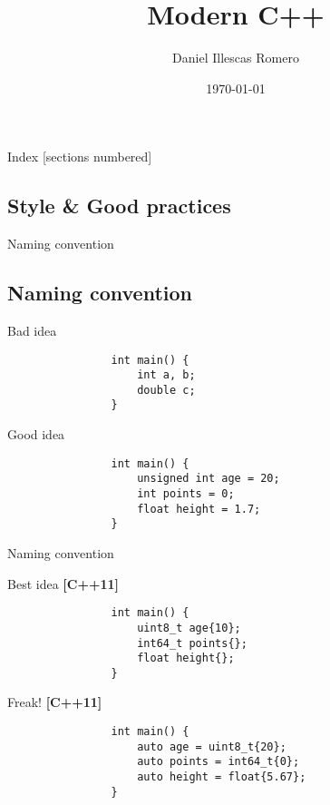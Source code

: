 \documentclass{beamer}
\title{Modern C++}
\author{Daniel Illescas Romero}
\date{\today}
\institute{University Of Granada [UGR]}
\newcommand{\normalSizeItem}[1] {
  \normalsize{\item #1}
}
\newcommand{\newFrameWithoutIndex}[1]{
	\begin{frame}
		#1
		\thispagestyle{empty}
	\end{frame}
}
\newcommand{\newSectionWithoutIndex}[1]{
	\newFrameWithoutIndex{\section{#1}}
}
\begin{document}
	\newFrameWithoutIndex{\maketitle}
	
	\begin{frame}{Index}		
		[sections numbered]
		\tableofcontents
	\end{frame}

	\newSectionWithoutIndex{Style \& Good practices}
  
		\begin{frame}[fragile]{Naming convention}	
			\subsection{Naming convention}
			\begin{itemize}
			
				\normalSizeItem {Bad idea}
				\begin{lstlisting}
				int main() {
					int a, b;
					double c;
				}
				\end{lstlisting}
				
				\normalSizeItem {Good idea}
				\begin{lstlisting}
				int main() {
					unsigned int age = 20;
					int points = 0;
					float height = 1.7;
				}
				\end{lstlisting}
				
			\end{itemize}
		\end{frame}
			 
		\begin{frame}[fragile]{Naming convention}	
			\begin{itemize}
			
				\normalSizeItem{Best idea \textbf{[C++11]}}
				\begin{lstlisting}
				int main() {
					uint8_t age{10};
					int64_t points{}; 
					float height{};
				}
				\end{lstlisting}
				
				\normalSizeItem{Freak! \textbf{[C++11]}}
				\begin{lstlisting}
				int main() {
					auto age = uint8_t{20};
					auto points = int64_t{0};
					auto height = float{5.67};
				}
				\end{lstlisting}
				
			\end{itemize}
		\end{frame}
		
\end{document}
